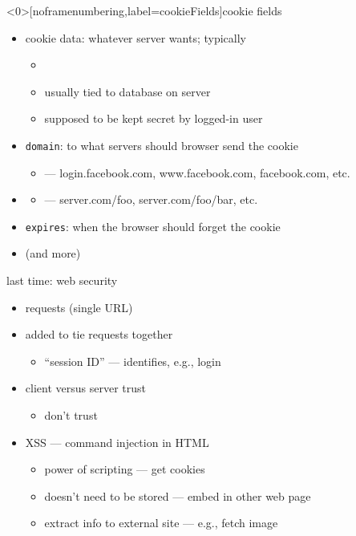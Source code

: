 \begin{frame}<0>[noframenumbering,label=cookieFields]{cookie fields}
    \begin{itemize}
        \item cookie data: whatever server wants; typically 
        \begin{itemize}
            \item {}
            \item usually tied to database on server
            \item supposed to be kept secret by logged-in user
        \end{itemize}
    \item \texttt{domain}: to what servers should browser send the cookie
        \begin{itemize}
            \item {} --- login.facebook.com, www.facebook.com, facebook.com, etc.
        \end{itemize}
    \item {}
        \begin{itemize}
            \item {} --- server.com/foo, server.com/foo/bar, etc.
        \end{itemize}
    \item \texttt{expires}: when the browser should forget the cookie
    \item (and more)
    \end{itemize}
\end{frame}

\begin{frame}{last time: web security}
    \begin{itemize}
    \item {} requests (single URL)
    \item added  to tie requests together
        \begin{itemize}
        \item ``session ID'' --- identifies, e.g., login
        \end{itemize}
    \item client versus server trust
        \begin{itemize}
            \item don't trust 
        \end{itemize}
    \item XSS --- command injection in HTML
        \begin{itemize}
        \item power of scripting --- get cookies
        \item doesn't need to be stored --- embed in other web page
        \item extract info to external site --- e.g., fetch image
        \end{itemize}
    \end{itemize}
\end{frame}


